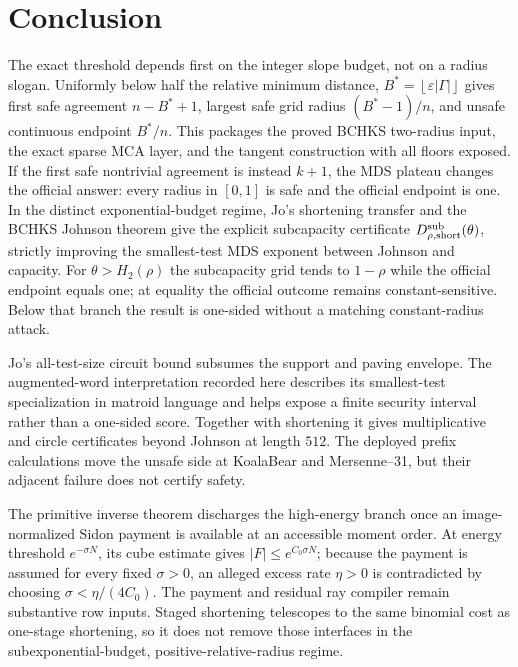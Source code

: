 \documentclass[11pt,a4paper]{amsart}
\numberwithin{equation}{section}
\theoremstyle{remark}
\newcommand{\eps}{\varepsilon}
\newcommand{\abs}[1]{\lvert #1\rvert}
\newcommand{\floor}[1]{\left\lfloor #1\right\rfloor}
\begin{document}
\section{Conclusion}\label{sec:conclusion}

The exact threshold depends first on the integer slope budget, not on a
radius slogan.  Uniformly below half the relative minimum distance,
\(B^*=\floor{\eps\abs\Gamma}\) gives first safe agreement
\(n-B^*+1\), largest safe grid radius \((B^*-1)/n\), and unsafe
continuous endpoint \(B^*/n\).  This packages the proved BCHKS
two-radius input, the exact sparse MCA layer, and the tangent construction
with all floors exposed.  If the first safe nontrivial agreement is instead
\(k+1\), the MDS plateau changes the official answer: every radius in
\([0,1]\) is safe and the official endpoint is one.  In the distinct
exponential-budget regime, Jo's shortening transfer and the BCHKS Johnson
theorem give the explicit subcapacity certificate
\(D_{\rho,\mathrm{short}}^{\rm sub}(\theta)\), strictly improving the
smallest-test MDS exponent between Johnson and capacity.  For
\(\theta>H_2(\rho)\) the subcapacity grid tends to \(1-\rho\) while the
official endpoint equals one; at equality the official outcome remains
constant-sensitive.  Below that branch the result is one-sided without a
matching constant-radius attack.

Jo's all-test-size circuit bound subsumes the support and paving envelope.
The augmented-word interpretation recorded here describes its smallest-test
specialization in matroid language and helps expose a
finite security interval rather than a one-sided score.  Together with
shortening it gives multiplicative and circle certificates beyond Johnson
at length \(512\).
The deployed prefix calculations move the unsafe side at KoalaBear and Mersenne--31,
but their adjacent failure does not certify safety.

The primitive inverse theorem discharges the high-energy branch once an
image-normalized Sidon payment is available at an accessible moment order.
At energy threshold \(e^{-\sigma N}\), its cube estimate gives
\(\abs F\le e^{C_0\sigma N}\); because the payment is assumed for every
fixed \(\sigma>0\), an alleged excess rate \(\eta>0\) is contradicted by
choosing \(\sigma<\eta/(4C_0)\).  The payment and residual ray compiler
remain substantive row inputs.  Staged shortening telescopes to the same
binomial cost as one-stage shortening, so it does not remove those
interfaces in the subexponential-budget, positive-relative-radius regime.
\end{document}
